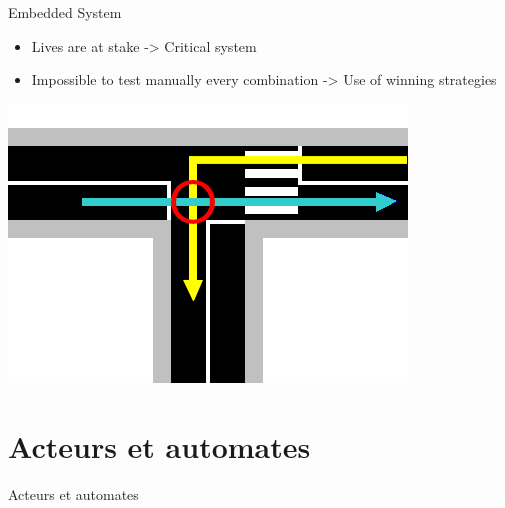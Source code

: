 \documentclass{bredelebeamer}
\begin{document}




\begin{frame}{Embedded System}
 \begin{itemize}
\item Lives are at stake -> Critical system
\item Impossible to test manually every combination -> Use of winning strategies
\end{itemize}
\centering
\includegraphics[scale=0.4]{images/exempleCollision.png}
\end{frame}

\section{Acteurs et automates}
\begin{frame}{Acteurs et automates}

\end{frame}
\end{document}
